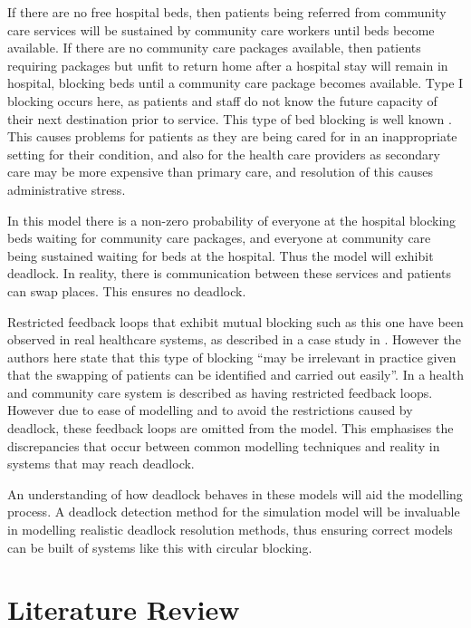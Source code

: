 \documentclass{article}
\numberwithin{equation}{section}
\begin{document}
If there are no free hospital beds, then patients being referred from
community care services will be sustained by community care workers until beds
become available.
If there are no community care packages available, then patients requiring
packages but unfit to return home after a hospital stay will remain in
hospital, blocking beds until a community care package becomes available.
Type I blocking occurs here, as patients and staff do not know the future
capacity of their next destination prior to service.
This type of bed blocking is well known \cite{manzano10}.
This causes problems for patients as they are being cared for in an
inappropriate setting for their condition, and also for the health care
providers as secondary care may be more expensive than primary care, and
resolution of this causes administrative stress.

In this model there is a non-zero probability of everyone at the hospital
blocking beds waiting for community care packages, and everyone at community
care being sustained waiting for beds at the hospital.
Thus the model will exhibit deadlock.
In reality, there is communication between these services and patients can
swap places.
This ensures no deadlock.

Restricted feedback loops that exhibit mutual blocking such as this one have
been observed in real healthcare systems, as described in a case study in
\cite{osoriobierlaire09}.
However the authors here state that this type of blocking ``may be irrelevant
in practice given that the swapping of patients can be identified and carried
out easily''.
In \cite{koizumietal05} a health and community care system is described as
having restricted feedback loops.
However due to ease of modelling and to avoid the restrictions caused by
deadlock, these feedback loops are omitted from the model.
This emphasises the discrepancies that occur between common modelling
techniques and reality in systems that may reach deadlock.

An understanding of how deadlock behaves in these models will aid the modelling
process.
A deadlock detection method for the simulation model will be invaluable in
modelling realistic deadlock resolution methods, thus ensuring correct models
can be built of systems like this with circular blocking.


\section{Literature Review}\label{sec:litreview}
\end{document}
